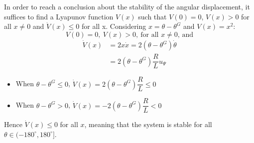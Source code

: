 In order to reach a conclusion about the stability of the angular displacement,
it suffices to find a Lyapunov function $V(x)$ such that $V(0) = 0$, $V(x) > 0$
for all $x \neq 0$ and $\dot{V}(x) \leq 0$ for all x. Considering
$x = \theta - \theta^G$ and $V(x) = x^2$:
$$V(0) = 0,\ V(x) > 0,\ \text{for all } x \neq 0\text{, and}$$
\begin{align*}
  \dot{V}(x) &= 2 x \dot{x} = 2 (\theta - \theta^G) \dot{\theta}  \\
             &= 2 (\theta - \theta^G) \dfrac{R}{L} u_{\Psi}
\end{align*}

\begin{itemize}
  \item When $\theta - \theta^G \leq 0$, $\dot{V}(x) = 2 (\theta - \theta^G) \dfrac{R}{L} \leq 0$
  \item When $\theta - \theta^G > 0$, $\dot{V}(x) = -2 (\theta - \theta^G) \dfrac{R}{L} < 0$
\end{itemize}

Hence $\dot{V}(x) \leq 0$ for all $x$, meaning that the system is stable for all
$\theta \in (-180^{\circ}, 180^{\circ}]$.

\begin{figure}[H]\centering
  \scalebox{0.9}{}
  \caption{}
  \label{fig:03}
\end{figure}
